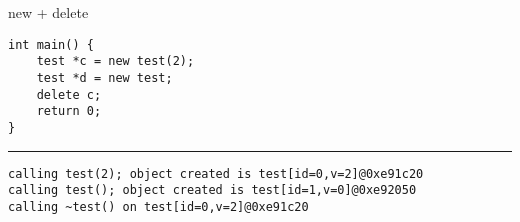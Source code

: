 \begin{frame}[fragile,label=testnewDel]{new + delete}
\begin{lstlisting}
int main() {
    test *c = new test(2);
    test *d = new test;
    delete c;
    return 0;
}
\end{lstlisting}
\hrule
{}
\begin{lstlisting}
calling test(2); object created is test[id=0,v=2]@0xe91c20
calling test(); object created is test[id=1,v=0]@0xe92050
calling ~test() on test[id=0,v=2]@0xe91c20
\end{lstlisting}
\end{frame}



